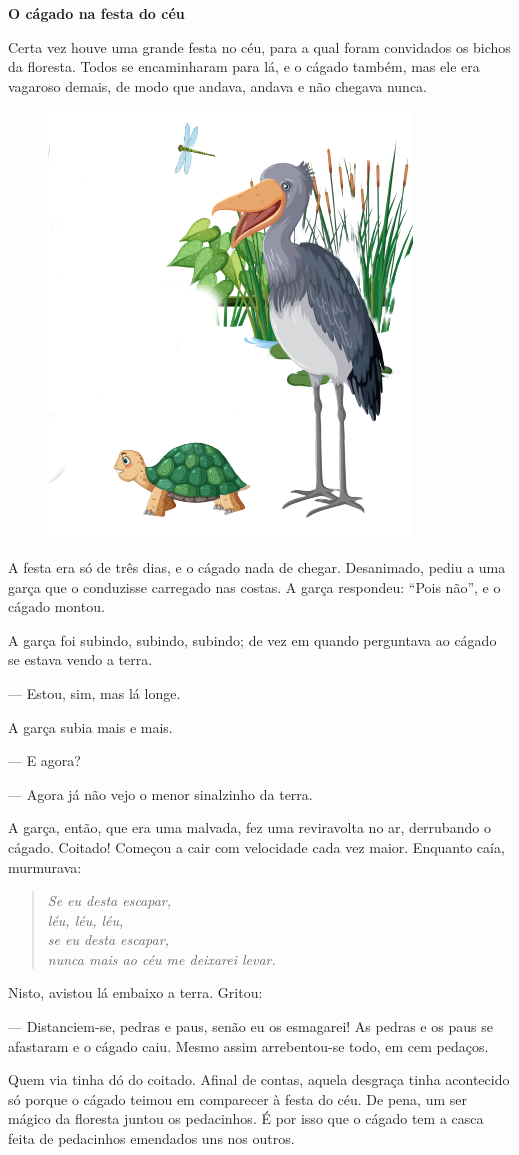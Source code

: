 \begin{myquote}
\textbf{O cágado na festa do céu}

Certa vez houve uma grande festa no céu, para a qual foram convidados os
bichos da floresta. Todos se encaminharam para lá, e o cágado também, mas
ele era vagaroso demais, de modo que andava, andava e não chegava
nunca.

\begin{figure}
\includegraphics[width=.4\textwidth]{./media/image19a.png}
\end{figure}

A festa era só de três dias, e o cágado nada de chegar. Desanimado, pediu
a uma garça que o conduzisse carregado nas costas. A garça respondeu: ``Pois não'', e
o cágado montou.

A garça foi subindo, subindo, subindo; de vez em quando perguntava ao
cágado se estava vendo a terra.

--- Estou, sim, mas lá longe.

A garça subia mais e mais.

--- E agora?

--- Agora já não vejo o menor sinalzinho da terra.

A garça, então, que era uma malvada, fez uma reviravolta no ar,
derrubando o cágado. Coitado! Começou a cair com velocidade cada vez
maior. Enquanto caía, murmurava:

\begin{verse}
\emph{Se eu desta escapar,}\\
\emph{léu, léu, léu,}\\
\emph{se eu desta escapar,}\\
\emph{nunca mais ao céu me deixarei levar.}\\
\end{verse}

Nisto, avistou lá embaixo a terra. Gritou:

--- Distanciem-se, pedras e paus, senão eu os esmagarei! As pedras e os paus
se afastaram e o cágado caiu. Mesmo assim arrebentou-se todo, em cem
pedaços.

Quem via tinha dó do coitado. Afinal de contas, aquela
desgraça tinha acontecido só porque o cágado teimou em comparecer à festa do
céu. De pena, um ser mágico da floresta juntou os pedacinhos.
É por isso que o cágado tem a casca feita de pedacinhos emendados uns
nos outros.

\end{myquote}

